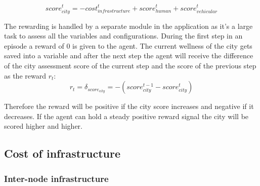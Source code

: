 \documentclass[
]{elteikthesis}[2023/04/10]
\begin{document}
\begin{equation}
score_{city}^{t}=-cost_{infrastructure}^{t}+score_{human}^{t}+score_{vehicular}^{t}
\end{equation}

The rewarding is handled by a separate module in the application as it's
a large task to assess all the variables and configurations. During
the first step in an episode a reward of 0 is given to the agent.
The current wellness of the city gets saved into a variable and after
the next step the agent will receive the difference of the city assessment
score of the current step and the score of the previous step as the
reward $r_{t}$: 
\begin{equation}
r_{t}=\delta_{score_{city}}=-(score_{city}^{t-1}-score_{city}^{t})
\end{equation}

Therefore the reward will be positive if the city score increases
and negative if it decreases. If the agent can hold a steady positive
reward signal the city will be scored higher and higher.

\subsection{Cost of infrastructure}

\subsubsection*{Inter-node infrastructure}
\end{document}
